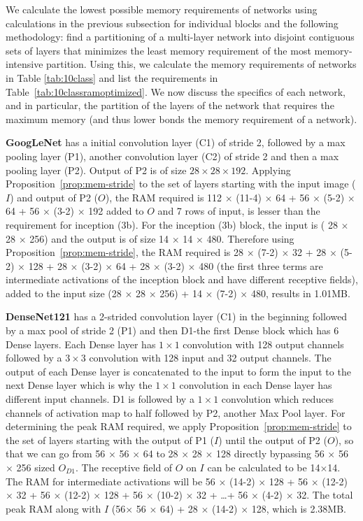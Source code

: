 \documentclass[10pt]{article}
\begin{document}
 
We calculate the lowest possible memory requirements of networks using
calculations in the previous subsection for individual blocks and the
following methodology: find a partitioning of a multi-layer network
into disjoint contiguous sets of layers that minimizes the least
memory requirement of the most memory-intensive partition.  Using
this, we calculate the memory requirements of networks in Table
\ref{tab:10class} and list the requirements in
Table~\ref{tab:10classramoptimized}. We now discuss the specifics of
each network, and in particular, the partition of the layers of the
network that requires the maximum memory (and thus lower bonds the
memory requirement of a network).

\textbf{GoogLeNet} has a initial convolution layer (C1) of stride 2,
followed by a max pooling layer (P1), another convolution layer (C2)
of stride 2 and then a max pooling layer (P2). Output of P2 is of size
$28 \times 28 \times 192$. Applying
Proposition~\ref{prop:mem-stride} to the set of layers starting with
the input image ($I$) and output of P2 ($O$), the RAM required is 112
$\times$ (11-4) $\times$ 64 + 56 $\times$ (5-2) $\times$ 64 + 56
$\times$ (3-2) $\times$ 192 added to $O$ and 7 rows of input, is
lesser than the requirement for inception (3b). For the inception (3b)
block, the input is ( 28 $\times$ 28 $\times$ 256) and the output is
of size 14 $\times$ 14 $\times$ 480. Therefore using
Proposition~\ref{prop:mem-stride}, the RAM required is 28 $\times$
(7-2) $\times$ 32 + 28 $\times$ (5-2) $\times$ 128 + 28 $\times$ (3-2)
$\times$ 64 + 28 $\times$ (3-2) $\times$ 480 (the first three terms
are intermediate activations of the inception block and have different
receptive fields), added to the input size (28 $\times$ 28 $\times$
256) + 14 $\times$ (7-2) $\times$ 480, results in 1.01MB.


\textbf{DenseNet121} has a 2-strided convolution layer (C1) in the
beginning followed by a max pool of stride 2 (P1) and then D1-the
first Dense block which has 6 Dense layers. Each Dense layer has
$1\times1$ convolution with 128 output channels followed by a
$3\times3$ convolution with 128 input and 32 output channels. The
output of each Dense layer is concatenated to the input to form the
input to the next Dense layer which is why the $1\times1$ convolution
in each Dense layer has different input channels. D1 is followed by a
$1\times1$ convolution which reduces channels of activation map to
half followed by P2, another Max Pool layer. For determining the peak
RAM required, we apply Proposition~\ref{prop:mem-stride} to the set of
layers starting with the output of P1 ($I$) until the output of P2
($O$), so that we can go from 56 $\times$ 56 $\times$ 64 to 28
$\times$ 28 $\times$ 128 directly bypassing 56 $\times$ 56 $\times$
256 sized $O_{D1}$. The receptive field of $O$ on $I$ can be
calculated to be 14$\times$14. The RAM for intermediate activations
will be 56 $\times$ (14-2) $\times$ 128 + 56 $\times$ (12-2) $\times$
32 + 56 $\times$ (12-2) $\times$ 128 + 56 $\times$ (10-2) $\times$ 32
+ \dots + 56 $\times$ (4-2) $\times$ 32. The total peak RAM along with
$I$ (56$ \times$ 56 $\times$ 64) + 28 $\times$ (14-2) $\times$ 128,
which is 2.38MB.
\end{document}
